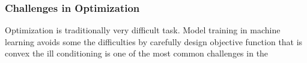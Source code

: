 \subsubsection{Challenges in Optimization}

Optimization is traditionally very difficult task. Model training in machine learning avoids some the difficulties by carefully design objective function that is convex 
the ill conditioning is one of the most common challenges in the 